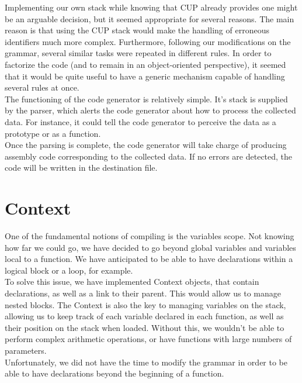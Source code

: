 \documentclass{scrartcl}
\begin{document}
Implementing our own stack while knowing that CUP already provides one might be an arguable decision, but it seemed appropriate for several reasons. The main reason is that using the CUP stack would make the handling of erroneous identifiers much more complex. Furthermore, following our modifications on the grammar, several similar tasks were repeated in different rules. In order to factorize the code (and to remain in an object-oriented perspective), it seemed that it would be quite useful to have a generic mechanism capable of handling several rules at once.\\

The functioning of the code generator is relatively simple. It's stack is supplied by the parser, which alerts the code generator about how to process the collected data. For instance, it could tell the code generator to perceive the data as a prototype or as a function.\\
Once the parsing is complete, the code generator will take charge of producing assembly code corresponding to the collected data. If no errors are detected, the code will be written in the destination file.


\section{Context}
One of the fundamental notions of compiling is the variables scope. Not knowing how far we could go, we have decided to go beyond global variables and variables local to a function. We have anticipated to be able to have declarations within a logical block or a loop, for example.\\

To solve this issue, we have implemented Context objects, that contain declarations, as well as a link to their parent. This would allow us to manage nested blocks. The Context is also the key to managing variables on the stack, allowing us to keep track of each variable declared in each function, as well as their position on the stack when loaded. Without this, we wouldn't be able to perform complex arithmetic operations, or have functions with large numbers of parameters.\\

Unfortunately, we did not have the time to modify the grammar in order to be able to have declarations beyond the beginning of a function.
\end{document}
